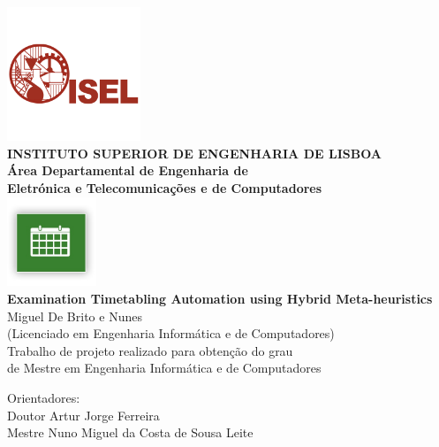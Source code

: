 \begin{titlepage}
	\begin{center}
		\includegraphics[width=0.3\textwidth,natwidth=720,natheight=434]{./images/isellogo.png} \\[0.5cm]
		{\Large \textbf{INSTITUTO SUPERIOR DE ENGENHARIA DE LISBOA}} \\[0.5cm]
		{\Large \textbf{Área Departamental de Engenharia de \\Eletrónica e Telecomunica\c cões e de Computadores}} \\[0.8cm]		
		\includegraphics[width=0.2\textwidth,natwidth=300,natheight=300]{./images/timetable.jpg} \\[0.8cm]
		\fontsize{18pt}{10pt}\selectfont
		{\textbf{Examination Timetabling Automation using Hybrid Meta-heuristics}} \\[0.8cm]
		\fontsize{16pt}{10pt}\selectfont
		Miguel De Brito e Nunes\\[0.2cm]
		\fontsize{14pt}{10pt}\selectfont
		(Licenciado em Engenharia Informática e de Computadores)\\[0.8cm]
		\fontsize{12pt}{10pt}\selectfont
		{Trabalho de projeto realizado para obten\c cão do grau\\de Mestre em Engenharia Informática e de Computadores} \\[0.8cm]
		\fontsize{16pt}{10pt}\selectfont
		\vfill
		\begin{tabbing}
		   \fontsize{12pt}{10pt}\selectfont
		   Orientadores: \\
		   \fontsize{11pt}{10pt}\selectfont
		   \hspace{1.1cm}Doutor Artur Jorge Ferreira \\
		   \fontsize{11pt}{10pt}\selectfont
		   \hspace{1.1cm}Mestre Nuno Miguel da Costa de Sousa Leite \\

\end{tabbing}
\end{center}
\end{titlepage}
